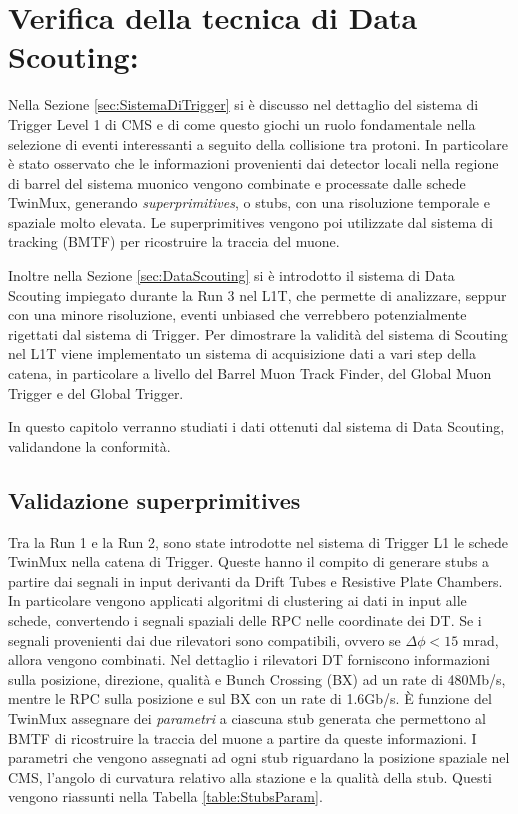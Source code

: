 \chapter{Verifica della tecnica di Data Scouting:}
\label{cap:SecondoCapitolo}

Nella Sezione \ref{sec:SistemaDiTrigger} si è discusso nel dettaglio del sistema di Trigger Level 1 di CMS e di come questo giochi un ruolo fondamentale nella selezione di eventi interessanti a seguito della collisione tra protoni. In particolare è stato osservato che le informazioni provenienti dai detector locali nella regione di barrel del sistema muonico vengono combinate e processate dalle schede TwinMux, generando \textit{superprimitives}, o stubs, con una risoluzione temporale e spaziale molto elevata. Le superprimitives vengono poi utilizzate dal sistema di tracking (BMTF) per ricostruire la traccia del muone.

Inoltre nella Sezione \ref{sec:DataScouting} si è introdotto il sistema di Data Scouting impiegato durante la Run 3 nel L1T, che permette di analizzare, seppur con una minore risoluzione, eventi unbiased che verrebbero potenzialmente rigettati dal sistema di Trigger. Per dimostrare la validità del sistema di Scouting nel L1T viene implementato un sistema di acquisizione dati a vari step della catena, in particolare a livello del Barrel Muon Track Finder, del Global Muon Trigger e del Global Trigger.

In questo capitolo verranno studiati i dati ottenuti dal sistema di Data Scouting, validandone la conformità.

\section{Validazione superprimitives}

Tra la Run 1 e la Run 2, sono state introdotte nel sistema di Trigger L1 le schede TwinMux nella catena di Trigger. Queste hanno il compito di generare stubs a partire dai segnali in input derivanti da Drift Tubes e Resistive Plate Chambers. \newline
In particolare vengono applicati algoritmi di clustering ai dati in input alle schede, convertendo i segnali spaziali delle RPC nelle coordinate dei DT. Se i segnali provenienti dai due rilevatori sono compatibili, ovvero se $\Delta \phi < 15$ \si{mrad}, allora vengono combinati. Nel dettaglio i rilevatori DT forniscono informazioni sulla posizione, direzione, qualità e Bunch Crossing (BX) ad un rate di 480Mb/s, mentre le RPC sulla posizione e sul BX con un rate di 1.6Gb/s.\newline
È funzione del TwinMux assegnare dei \textit{parametri} a ciascuna stub generata che permettono al BMTF di ricostruire la traccia del muone a partire da queste informazioni. I parametri che vengono assegnati ad ogni stub riguardano la posizione spaziale nel CMS, l'angolo di curvatura relativo alla stazione e la qualità della stub. Questi vengono riassunti nella Tabella \ref{table:StubsParam}.

